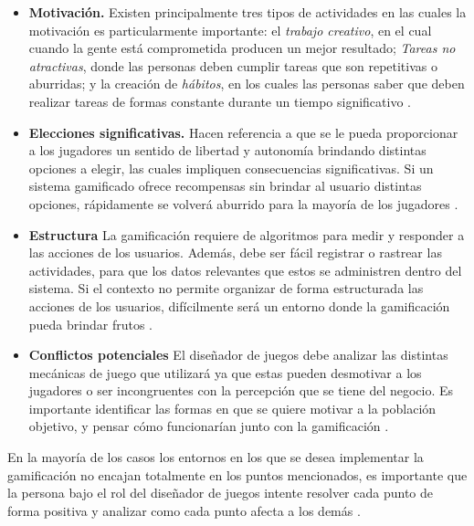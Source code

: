     \begin{itemize}
    \item
    {\bf Motivación.}
        Existen principalmente tres tipos de actividades en las cuales la motivación
        es particularmente importante: el {\em trabajo creativo}, en el cual cuando la gente
        está comprometida producen un mejor resultado; {\em Tareas no atractivas}, donde las
        personas deben cumplir tareas que son repetitivas o aburridas; y la creación de
        {\em hábitos}, en los cuales las personas saber que deben realizar tareas de formas
        constante durante un tiempo significativo \cite[p. 31]{ForTheWin}.
        \clearpage

    \item
    {\bf Elecciones significativas.}
        Hacen referencia a que se le pueda proporcionar a los jugadores un sentido de libertad
        y autonomía brindando distintas opciones a elegir, las cuales impliquen consecuencias
        significativas. Si un sistema gamificado ofrece recompensas sin brindar al usuario
        distintas opciones, rápidamente se volverá aburrido para la mayoría de los jugadores
        \cite[p. 32]{ForTheWin}.

    \item {\bf Estructura}
        La gamificación requiere de algoritmos para medir y responder a las acciones de los
        usuarios. Además, debe ser fácil registrar o rastrear las actividades, para que los
        datos relevantes que estos se administren dentro del sistema. Si el contexto no permite
        organizar de forma estructurada las acciones de los usuarios, difícilmente será un
        entorno donde la gamificación pueda brindar frutos \cite[p. 32]{ForTheWin}.

    \item {\bf Conflictos potenciales}
        El diseñador de juegos debe analizar las distintas mecánicas de juego que utilizará
        ya que estas pueden desmotivar a los jugadores o ser incongruentes con la percepción
        que se tiene del negocio. Es importante identificar las formas en que se quiere motivar
        a la población objetivo, y pensar cómo funcionarían junto con la gamificación
        \cite[p. 33]{ForTheWin}.

    \end{itemize}


    \noindent En la mayoría de los casos los entornos en los que se desea implementar la gamificación
    no encajan totalmente en los puntos mencionados, es importante que la persona bajo el rol del
    diseñador de juegos intente resolver cada punto de forma positiva y analizar como cada punto
    afecta a los demás \cite[p. 34]{ForTheWin}.



